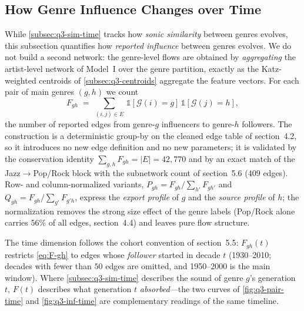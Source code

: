 
\subsection{How Genre Influence Changes over Time}\label{subsec:q3-inf-time}

While \cref{subsec:q3-sim-time} tracks how \emph{sonic similarity} between
genres evolves, this subsection quantifies how \emph{reported influence}
between genres evolves. We do not build a second network: the genre-level
flows are obtained by \emph{aggregating} the artist-level network of
Model~I over the genre partition, exactly as the Katz-weighted centroids
of \cref{subsec:q3-centroids} aggregate the feature vectors. For each pair
of main genres $(g,h)$ we count
\begin{equation}\label{eq:F-gh}
F_{gh} \;=\; \sum_{(i,j)\in E}\,
\mathbb{1}\!\left[\mathcal{G}(i)=g\right]\,
\mathbb{1}\!\left[\mathcal{G}(j)=h\right],
\end{equation}
the number of reported edges from genre-$g$ influencers to genre-$h$
followers. The construction is a deterministic group-by on the cleaned
edge table of section~4.2, so it introduces no new edge definition and no
new parameters; it is validated by the conservation identity
$\sum_{g,h}F_{gh}=|E|=42{,}770$ and by an exact match of the
Jazz$\to$Pop/Rock block with the subnetwork count of section~5.6
($409$ edges). Row- and column-normalized variants,
$P_{gh}=F_{gh}\big/\sum_{h'}F_{gh'}$ and
$Q_{gh}=F_{gh}\big/\sum_{g'}F_{g'h}$, express the \emph{export profile} of
$g$ and the \emph{source profile} of $h$; the normalization removes the
strong size effect of the genre labels (Pop/Rock alone carries $56\%$ of
all edges, section~4.4) and leaves pure flow structure.

The time dimension follows the cohort convention of section~5.5:
$F_{gh}(t)$ restricts \eqref{eq:F-gh} to edges whose \emph{follower}
started in decade $t$ (1930--2010; decades with fewer than $50$ edges are
omitted, and 1950--2000 is the main window). Where
\cref{subsec:q3-sim-time} describes the sound of genre $g$'s generation
$t$, $F(t)$ describes what generation $t$ \emph{absorbed}---the two
curves of \cref{fig:q3-pair-time} and \cref{fig:q3-inf-time} are
complementary readings of the same timeline.

